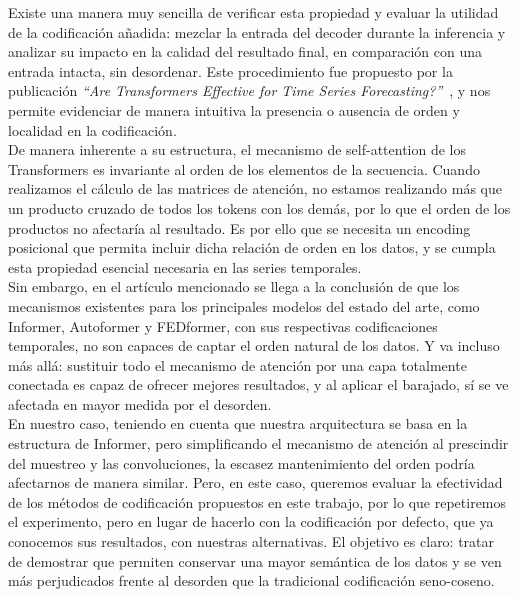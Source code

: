 Existe una manera muy sencilla de verificar esta propiedad y evaluar la utilidad de la codificación añadida: mezclar la entrada del decoder durante la inferencia y analizar su impacto en la calidad del resultado final, en comparación con una entrada intacta, sin desordenar. Este procedimiento fue propuesto por la publicación \textit{``Are Transformers Effective for Time Series Forecasting?''}~\cite{zeng2022transformerseffectivetimeseries}, y nos permite evidenciar de manera intuitiva la presencia o ausencia de orden y localidad en la codificación.\\

De manera inherente a su estructura, el mecanismo de self-attention de los Transformers es invariante al orden de los elementos de la secuencia. Cuando realizamos el cálculo de las matrices de atención, no estamos realizando más que un producto cruzado de todos los tokens con los demás, por lo que el orden de los productos no afectaría al resultado. Es por ello que se necesita un encoding posicional que permita incluir dicha relación de orden en los datos, y se cumpla esta propiedad esencial necesaria en las series temporales.\\

Sin embargo, en el artículo mencionado se llega a la conclusión de que los mecanismos existentes para los principales modelos del estado del arte, como Informer, Autoformer y FEDformer, con sus respectivas codificaciones temporales, no son capaces de captar el orden natural de los datos. Y va incluso más allá: sustituir todo el mecanismo de atención por una capa totalmente conectada es capaz de ofrecer mejores resultados, y al aplicar el barajado, sí se ve afectada en mayor medida por el desorden. \\

En nuestro caso, teniendo en cuenta que nuestra arquitectura se basa en la estructura de Informer, pero simplificando el mecanismo de atención al prescindir del muestreo y las convoluciones, la escasez mantenimiento del orden podría afectarnos de manera similar. Pero, en este caso, queremos evaluar la efectividad de los métodos de codificación propuestos en este trabajo, por lo que repetiremos el experimento, pero en lugar de hacerlo con la codificación por defecto, que ya conocemos sus resultados, con nuestras alternativas. El objetivo es claro: tratar de demostrar que permiten conservar una mayor semántica de los datos y se ven más perjudicados frente al desorden que la tradicional codificación seno-coseno.

